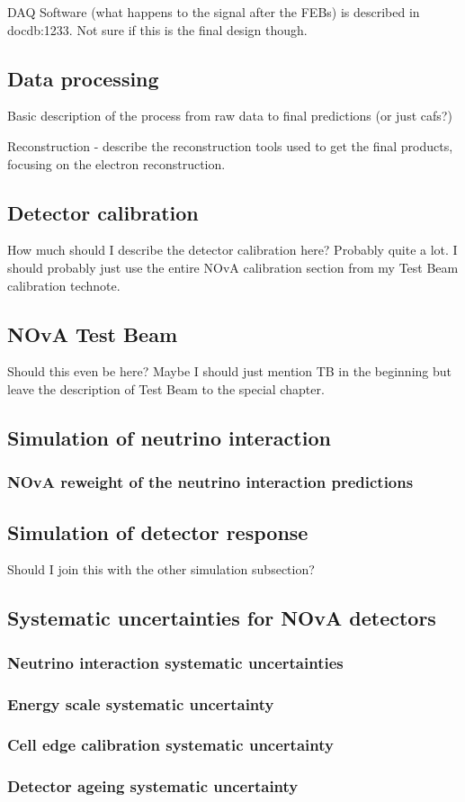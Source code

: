 DAQ Software (what happens to the signal after the FEBs) is described in docdb:1233. Not sure if this is the final design though. 

\subsection{Data processing}
Basic description of the process from raw data to final predictions (or just cafs?)

Reconstruction - describe the reconstruction tools used to get the final products, focusing on the electron reconstruction.

\subsection{Detector calibration}

How much should I describe the detector calibration here? Probably quite a lot. I should probably just use the entire NOvA calibration section from my Test Beam calibration technote.

\subsection{NOvA Test Beam}
Should this even be here? Maybe I should just mention TB in the beginning but leave the description of Test Beam to the special chapter.

\subsection{Simulation of neutrino interaction}

\subsubsection{NOvA reweight of the neutrino interaction predictions}

\subsection{Simulation of detector response}
Should I join this with the other simulation subsection?

\subsection{Systematic uncertainties for NOvA detectors}

\subsubsection{Neutrino interaction systematic uncertainties}

\subsubsection{Energy scale systematic uncertainty}

\subsubsection{Cell edge calibration systematic uncertainty}

\subsubsection{Detector ageing systematic uncertainty}

